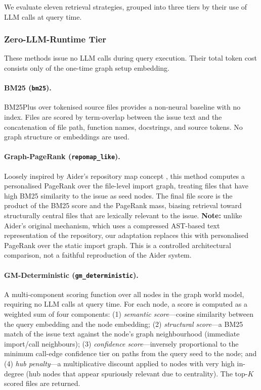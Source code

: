 We evaluate eleven retrieval strategies, grouped into three tiers by their use of LLM calls at query time.

\subsubsection{Zero-LLM-Runtime Tier}
\label{sec:tier_zero}

These methods issue no LLM calls during query execution. Their total token cost consists only of the one-time graph setup embedding.

\paragraph{BM25 (\texttt{bm25}).}
BM25Plus \citep{lv2011lower} over tokenised source files provides a non-neural baseline with no index. Files are scored by term-overlap between the issue text and the concatenation of file path, function names, docstrings, and source tokens. No graph structure or embeddings are used.

\paragraph{Graph-PageRank (\texttt{repomap\_like}).}
Loosely inspired by Aider's repository map concept \citep{aider2023}, this method computes a personalised PageRank over the file-level import graph, treating files that have high BM25 similarity to the issue as seed nodes. The final file score is the product of the BM25 score and the PageRank mass, biasing retrieval toward structurally central files that are lexically relevant to the issue. \textbf{Note:} unlike Aider's original mechanism, which uses a compressed AST-based text representation of the repository, our adaptation replaces this with personalised PageRank over the static import graph. This is a controlled architectural comparison, not a faithful reproduction of the Aider system.

\paragraph{GM-Deterministic (\texttt{gm\_deterministic}).}
A multi-component scoring function over all nodes in the graph world model, requiring no LLM calls at query time. For each node, a score is computed as a weighted sum of four components: (1) \emph{semantic score}---cosine similarity between the query embedding and the node embedding; (2) \emph{structural score}---a BM25 match of the issue text against the node's graph neighbourhood (immediate import/call neighbours); (3) \emph{confidence score}---inversely proportional to the minimum call-edge confidence tier on paths from the query seed to the node; and (4) \emph{hub penalty}---a multiplicative discount applied to nodes with very high in-degree (hub nodes that appear spuriously relevant due to centrality). The top-$K$ scored files are returned.

